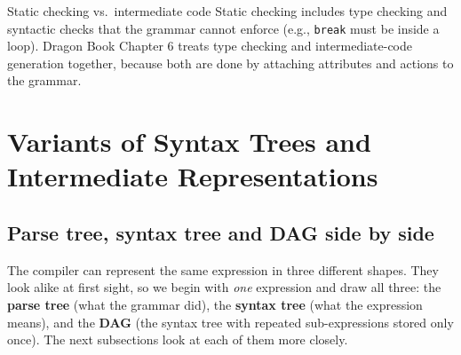\documentclass[11pt,a4paper]{article}
\begin{document}
\begin{notebox}{Static checking vs.\ intermediate code}
Static checking includes type checking and syntactic checks that the grammar cannot enforce (e.g., \texttt{break} must be inside a loop). Dragon Book Chapter 6 treats type checking and intermediate-code generation together, because both are done by attaching attributes and actions to the grammar.
\end{notebox}

\section{Variants of Syntax Trees and Intermediate Representations}

\subsection{Parse tree, syntax tree and DAG side by side}
\label{sec:threetrees}

The compiler can represent the same expression in three different shapes. They look alike at first sight, so we begin with \emph{one} expression and draw all three: the \textbf{parse tree} (what the grammar did), the \textbf{syntax tree} (what the expression means), and the \textbf{DAG} (the syntax tree with repeated sub-expressions stored only once). The next subsections look at each of them more closely.
\end{document}
